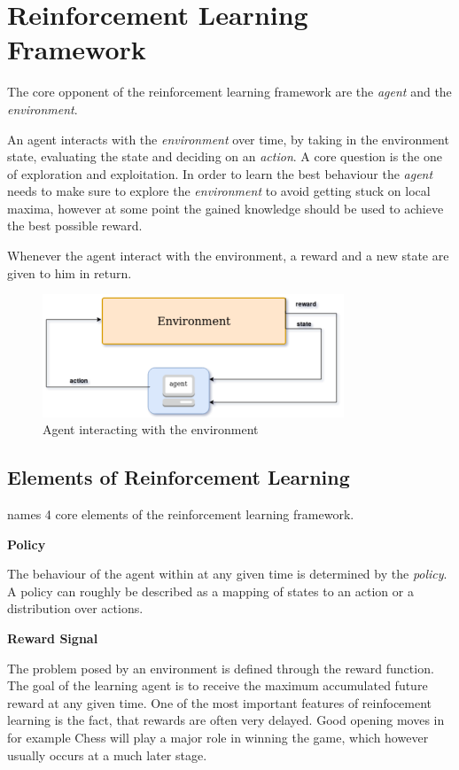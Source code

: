 \section{Reinforcement Learning Framework}\raggedbottom 
The core opponent of the reinforcement learning framework are the \textit{agent} and the \textit{environment}.

An agent interacts with the \textit{environment} over time, by taking in the environment state, evaluating the state and deciding on an \textit{action}. 
A core question is the one of exploration and exploitation. In order to learn the best behaviour the \textit{agent} needs to make sure to explore the \textit{environment} to avoid getting stuck on local maxima, however at some point the gained knowledge should be used to achieve the best possible reward.

Whenever the agent interact with the environment, a reward and a new state are given to him in return.
\begin{figure}
\includegraphics[width=90mm]{bilder/RLFramework.png}
\caption{Agent interacting with the environment}
\end{figure}


\subsection{Elements of Reinforcement Learning}
\citet{Sut98} names 4 core elements of the reinforcement learning framework.

\textbf{Policy}

The behaviour of the agent within at any given time is determined by the \textit{policy}. A policy can roughly be described as a mapping of states to an action or a distribution over actions. 

\textbf{Reward Signal}

The problem posed by an environment is defined through the reward function. The goal of the learning agent is to receive the maximum accumulated future reward at any given time. One of the most important features of reinfocement learning is the fact, that rewards are often very delayed. Good opening moves in for example Chess will play a major role in winning the game, which however usually occurs at a much later stage. 

